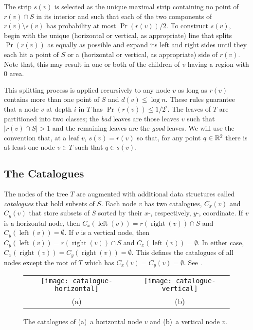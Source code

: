 \documentclass[lotsofwhite,charterfonts]{patmorin}
\DeclareMathOperator{\lft}{left}
\DeclareMathOperator{\rght}{right}
\newcommand{\depth}{d}
\begin{document}
The strip $s(v)$ is selected as the unique maximal strip containing no
point of $r(v)\cap S$ in its interior and such that each of the two
components of $r(v)\setminus s(v)$ has probability at most
$\Pr(r(v))/2$.  To construct $s(v)$, begin with the unique (horizontal
or vertical, as appropriate) line that splits $\Pr(r(v))$ as equally
as possible and expand its left and right sides until they each hit a
point of $S$ or a (horizontal or vertical, as appropriate) side of
$r(v)$. Note that, this may result in one or both of the children of
$v$ having a region with 0 area.

This splitting process is applied recursively to any
node $v$ as long as $r(v)$ contains more than one point of $S$ and
$\depth(v)\le \log n$. These rules guarantee that a node $v$ at depth
$i$ in $T$ has $\Pr(r(v))\le 1/2^i$.
The leaves of $T$ are partitioned into two classes; the \emph{bad}
leaves are those leaves $v$ such that $|r(v)\cap S| > 1$ and the
remaining leaves are the \emph{good} leaves.  We will use the
convention that, at a leaf $v$, $s(v)=r(v)$ so that, for any point
$q\in\mathbb{R}^2$ there is at least one node $v\in T$ such that $q\in s(v)$.

\subsection{The Catalogues}

The nodes of the tree $T$ are augmented with additional data
structures called \emph{catalogues} that hold subsets of $S$.  Each
node $v$ has two catalogues, $C_x(v)$ and $C_y(v)$ that store subsets
of $S$ sorted by their $x$-, respectively, $y$-, coordinate.  If $v$
is a horizontal node, then $C_x(\lft(v))= r(\rght(v))\cap S$ and
$C_y(\lft(v))=\emptyset$.  If $v$ is a vertical node, then
$C_y(\lft(v)) = r(\rght(v))\cap S$ and $C_x(\lft(v))=\emptyset$.  In
either case, $C_x(\rght(v))=C_y(\rght(v))=\emptyset$.  This defines
the catalogues of all nodes except the root of $T$ which has
$C_x(v)=C_y(v)=\emptyset$. See .

\begin{figure}
  \begin{center}
    \begin{tabular}{c|c}
      \texttt{[image: catalogue-horizontal]} &
        \texttt{[image: catalogue-vertical]} \\
       (a) & (b) 
    \end{tabular}
  \end{center}
  \caption{The catalogues of (a)~a horizontal node $v$ and (b)~a
  vertical node $v$.}
\end{figure}
\end{document}
